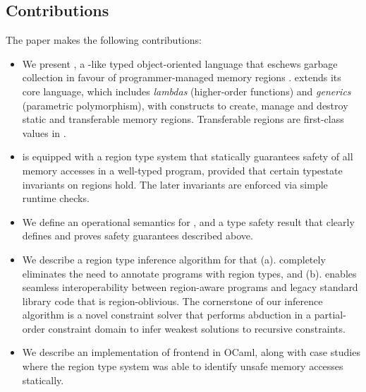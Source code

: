 \subsection*{Contributions}

The paper makes the following contributions:

\begin{itemize} 
  \item We present \name, a \csharp-like typed
  object-oriented language that eschews garbage collection in favour of
  programmer-managed memory regions . \name extends its core language,
  which includes \emph{lambdas} (higher-order functions) and
  \emph{generics} (parametric polymorphism), with constructs to create,
  manage and destroy static and transferable memory regions. Transferable regions
  are first-class values in \name.

  \item \name is equipped with a region type system that statically
  guarantees safety of all memory accesses in a well-typed program,
  provided that certain typestate invariants on regions hold.  The
  later invariants are enforced via simple runtime checks.

  \item We define an operational semantics for \name, and a type
  safety result that clearly defines and proves safety guarantees
  described above.

  \item We describe a region type inference algorithm for \name that
  (a). completely eliminates the need to annotate \name programs with
  region types, and (b). enables seamless interoperability between
  region-aware \name programs and legacy standard library code that is
  region-oblivious. The cornerstone of our inference algorithm is a
  novel constraint solver that performs abduction in a partial-order
  constraint domain to infer weakest solutions to recursive
  constraints.

  \item We describe an implementation of \name frontend in OCaml,
  along with case studies where the region type system was able to
  identify unsafe memory accesses statically.
  
\end{itemize}

